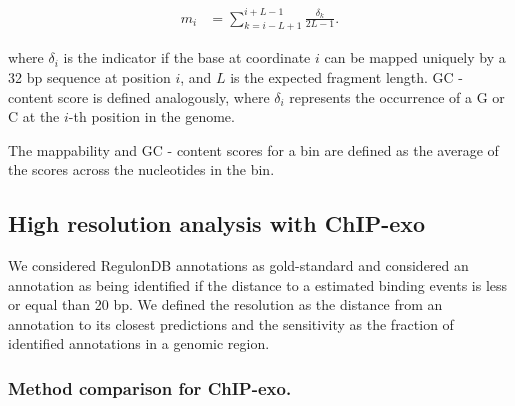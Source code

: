 \documentclass{bmcart}
\begin{document}
\begin{align*}
  m_i &= \sum_{k = i - L +1}^{i + L - 1} \frac{\delta_k }{2L - 1}.
\end{align*}

where $\delta_i$ is the indicator if the base at coordinate $i$ can be
mapped uniquely by a 32 bp sequence at position $i$, and $L$ is the
expected fragment length. GC - content score is defined analogously,
where $\delta_i$ represents the occurrence of a G or C at the $i$-th
position in the genome. 

The mappability and GC - content scores for a bin are defined as the
average of the scores across the nucleotides in the bin.




\subsection*{High resolution analysis with ChIP-exo}

We considered RegulonDB \cite{regulondb} annotations as gold-standard
and considered an annotation as being identified if the distance to a
estimated binding events is less or equal than 20 bp. We defined the
resolution as the distance from an annotation to its closest
predictions and the sensitivity as the fraction of identified
annotations in a genomic region.

\subsubsection*{Method comparison for ChIP-exo.}
\end{document}
